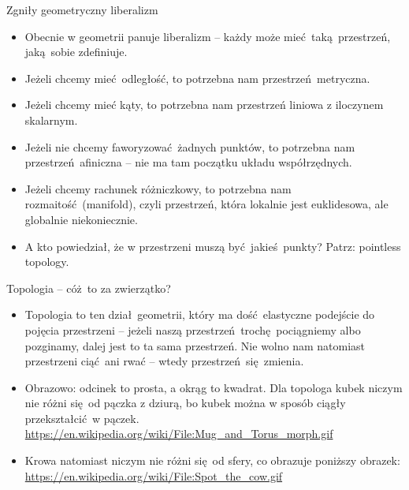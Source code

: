 \documentclass{beamer}
\begin{document}
\begin{frame}{Zgniły geometryczny liberalizm}
\begin{itemize}
	\item Obecnie w geometrii panuje liberalizm -- każdy może mieć taką przestrzeń, jaką sobie zdefiniuje.
	\item Jeżeli chcemy mieć odległość, to potrzebna nam przestrzeń metryczna.
	\item Jeżeli chcemy mieć kąty, to potrzebna nam przestrzeń liniowa z iloczynem skalarnym.
	\item Jeżeli nie chcemy faworyzować żadnych punktów, to potrzebna nam przestrzeń afiniczna -- nie ma tam początku układu współrzędnych.
	\item Jeżeli chcemy rachunek różniczkowy, to potrzebna nam rozmaitość (manifold), czyli przestrzeń, która lokalnie jest euklidesowa, ale globalnie niekoniecznie.
	\item A kto powiedział, że w przestrzeni muszą być jakieś punkty? Patrz: pointless topology.
\end{itemize}
\end{frame}

\begin{frame}{Topologia -- cóż to za zwierzątko?}
\begin{itemize}
	\item Topologia to ten dział geometrii, który ma dość elastyczne podejście do pojęcia przestrzeni -- jeżeli naszą przestrzeń trochę pociągniemy albo pozginamy, dalej jest to ta sama przestrzeń. Nie wolno nam natomiast przestrzeni ciąć ani rwać -- wtedy przestrzeń się zmienia.
	\item Obrazowo: odcinek to prosta, a okrąg to kwadrat. Dla topologa kubek niczym nie różni się od pączka z dziurą, bo kubek można w sposób ciągły przekształcić w pączek. \url{https://en.wikipedia.org/wiki/File:Mug_and_Torus_morph.gif}
	\item Krowa natomiast niczym nie różni się od sfery, co obrazuje poniższy obrazek: \url{https://en.wikipedia.org/wiki/File:Spot_the_cow.gif}
\end{itemize}
\end{frame}
\end{document}
